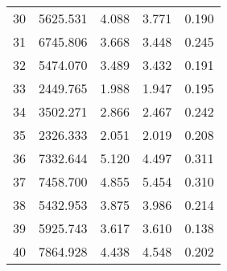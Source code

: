 \begin{table}[!ht]
{\begin{tabular}{r c c c c}
30 & 5625.531 & 4.088 & 3.771 & 0.190 \\
31 & 6745.806 & 3.668 & 3.448 & 0.245 \\
32 & 5474.070 & 3.489 & 3.432 & 0.191 \\
33 & 2449.765 & 1.988 & 1.947 & 0.195 \\
34 & 3502.271 & 2.866 & 2.467 & 0.242 \\
35 & 2326.333 & 2.051 & 2.019 & 0.208 \\
36 & 7332.644 & 5.120 & 4.497 & 0.311 \\
37 & 7458.700 & 4.855 & 5.454 & 0.310 \\
38 & 5432.953 & 3.875 & 3.986 & 0.214 \\
39 & 5925.743 & 3.617 & 3.610 & 0.138 \\
40 & 7864.928 & 4.438 & 4.548 & 0.202 \\
\end{tabular}}
\end{table}
